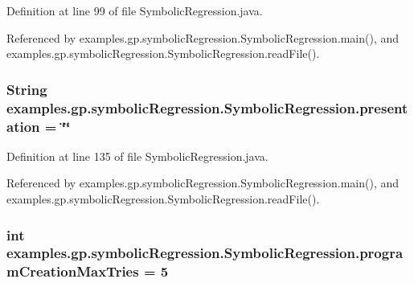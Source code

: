 Definition at line 99 of file Symbolic\-Regression.\-java.



Referenced by examples.\-gp.\-symbolic\-Regression.\-Symbolic\-Regression.\-main(), and examples.\-gp.\-symbolic\-Regression.\-Symbolic\-Regression.\-read\-File().

\hypertarget{classexamples_1_1gp_1_1symbolic_regression_1_1_symbolic_regression_ad6b0a1e41c631b55e3a6ed93dd871ea6}{
\subsubsection[{presentation}]{\setlength{\rightskip}{0pt plus 5cm}String examples.\-gp.\-symbolic\-Regression.\-Symbolic\-Regression.\-presentation = \char`\"{}\char`\"{}\hspace{0.3cm}{\ttfamily [static]}}}\label{classexamples_1_1gp_1_1symbolic_regression_1_1_symbolic_regression_ad6b0a1e41c631b55e3a6ed93dd871ea6}


Definition at line 135 of file Symbolic\-Regression.\-java.



Referenced by examples.\-gp.\-symbolic\-Regression.\-Symbolic\-Regression.\-main(), and examples.\-gp.\-symbolic\-Regression.\-Symbolic\-Regression.\-read\-File().

\hypertarget{classexamples_1_1gp_1_1symbolic_regression_1_1_symbolic_regression_a4f2c58d2d2a88ad848d4c8b8e673a990}{
\subsubsection[{program\-Creation\-Max\-Tries}]{\setlength{\rightskip}{0pt plus 5cm}int examples.\-gp.\-symbolic\-Regression.\-Symbolic\-Regression.\-program\-Creation\-Max\-Tries = 5\hspace{0.3cm}{\ttfamily [static]}}}\label{classexamples_1_1gp_1_1symbolic_regression_1_1_symbolic_regression_a4f2c58d2d2a88ad848d4c8b8e673a990}


